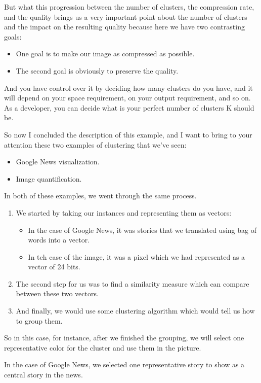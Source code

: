 \documentclass[a4paper, 12pt]{article}
\begin{document}
But what this progression between the number of clusters, the compression rate,
and the quality brings us a very important point about the number of clusters
and the impact on the resulting quality because here we have two contrasting
goals:

\begin{itemize}
\item One goal is to make our image as compressed as possible.
\item The second goal is obviously to preserve the quality.
\end{itemize}

And you have control over it by deciding how many clusters do you have, and it
will depend on your space requirement, on your output requirement, and so on. As
a developer, you can decide what is your perfect number of clusters K should be.

So now I concluded the description of this example, and I want to bring to your
attention these two examples of clustering that we've seen:

\begin{itemize}
\item Google News visualization.
\item Image quantification.
\end{itemize}

In both of these examples, we went through the same process.

\begin{enumerate}
\item We started by taking our instances and representing them as vectors:

\begin{itemize}
\item In the case of Google News, it was stories that we translated using bag of
words into a vector.
\item In teh case of the image, it was a pixel which we had represented as a
vector of 24 bits.
\end{itemize}

\item The second step for us was to find a similarity measure which can compare
between these two vectors.

\item And finally, we would use some clustering algorithm which would tell us how to
group them.
\end{enumerate}

So in this case, for instance, after we finished the grouping, we will select
one representative color for the cluster and use them in the picture.

In the case of Google News, we selected one representative story to show as a
central story in the news.
\end{document}
